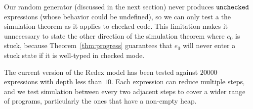 
Our random generator (discussed in the next section) never produces
$\mathtt{unchecked}$ expressions (whose behavior could be undefined), so we
can only test a the simulation theorem 
as it applies to checked code. This limitation makes it
unnecessary to state the other direction of the simulation theorem
where $e_0$ is stuck, because Theorem~\ref{thm:progress} guarantees
that $e_0$ will never enter a stuck state if it is well-typed in
checked mode.

The current version of the Redex model has been tested against $20000$
expressions with depth less than $10$. Each expression can
reduce multiple steps, and we test simulation between every two
adjacent steps to cover a wider range of programs, particularly the
ones that have a non-empty heap.

